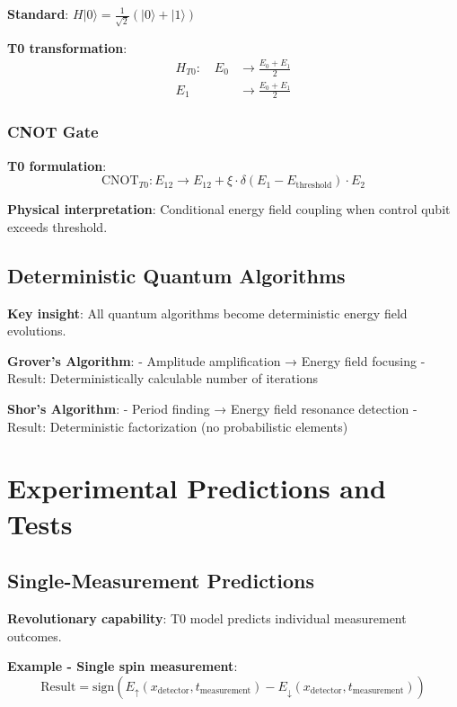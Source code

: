 \documentclass[12pt,a4paper]{article}
\newcommand{\Efield}{E}
\newcommand{\xipar}{\xi}
\begin{document}
	\textbf{Standard}: $H|0\rangle = \frac{1}{\sqrt{2}}(|0\rangle + |1\rangle)$
	
	\textbf{T0 transformation}:
	\begin{align}
		H_{T0}: \quad \Efield_0 &\rightarrow \frac{\Efield_0 + \Efield_1}{2} \\
		\Efield_1 &\rightarrow \frac{\Efield_0 + \Efield_1}{2}
	\end{align}
	
	\subsubsection{CNOT Gate}
	
	\textbf{T0 formulation}:
	\begin{equation}
		\text{CNOT}_{T0}: \Efield_{12} \rightarrow \Efield_{12} + \xipar \cdot \delta(\Efield_1 - \Efield_{\text{threshold}}) \cdot \Efield_2
	\end{equation}
	
	\textbf{Physical interpretation}: Conditional energy field coupling when control qubit exceeds threshold.
	
	\subsection{Deterministic Quantum Algorithms}
	
	\textbf{Key insight}: All quantum algorithms become deterministic energy field evolutions.
	
	\textbf{Grover's Algorithm}:
	- Amplitude amplification → Energy field focusing
	- Result: Deterministically calculable number of iterations
	
	\textbf{Shor's Algorithm}:
	- Period finding → Energy field resonance detection
	- Result: Deterministic factorization (no probabilistic elements)
	
	\section{Experimental Predictions and Tests}
	
	\subsection{Single-Measurement Predictions}
	
	\textbf{Revolutionary capability}: T0 model predicts individual measurement outcomes.
	
	\textbf{Example - Single spin measurement}:
	\begin{equation}
		\text{Result} = \text{sign}\left(\Efield_{\uparrow}(x_{\text{detector}}, t_{\text{measurement}}) - \Efield_{\downarrow}(x_{\text{detector}}, t_{\text{measurement}})\right)
	\end{equation}
	
\end{document}
